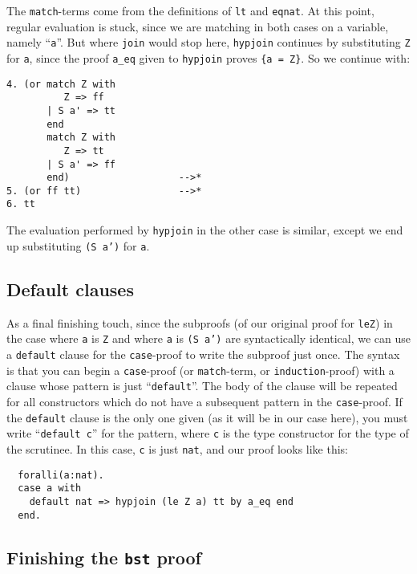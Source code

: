 \documentclass{book}[12pt]
\begin{document}
\noindent The \texttt{match}-terms come from the definitions of
\texttt{lt} and \texttt{eqnat}.  At this point, regular evaluation is
stuck, since we are matching in both cases on a variable, namely
``\texttt{a}''.  But where \texttt{join} would stop here,
\texttt{hypjoin} continues by substituting \texttt{Z} for \texttt{a},
since the proof \texttt{a\_eq} given to \texttt{hypjoin} proves
\texttt{\{a = Z\}}.  So we continue with:
                
\begin{verbatim}
4. (or match Z with
          Z => ff
       | S a' => tt
       end
       match Z with
          Z => tt
       | S a' => ff
       end)                   -->*
5. (or ff tt)                 -->*
6. tt
\end{verbatim}

\noindent The evaluation performed by \texttt{hypjoin} in the other
case is similar, except we end up substituting \texttt{(S a')} for
\texttt{a}.

\subsection{Default clauses}

As a final finishing touch, since the subproofs (of our original proof
for \texttt{leZ}) in the case where \texttt{a} is \texttt{Z} and where
\texttt{a} is \texttt{(S a')} are syntactically identical, we can use
a \texttt{default} clause for the \texttt{case}-proof to write the
subproof just once.  The syntax is that you can begin a
\texttt{case}-proof (or \texttt{match}-term, or
\texttt{induction}-proof) with a clause whose pattern is just
``\texttt{default}''.  The body of the clause will be repeated for all
constructors which do not have a subsequent pattern in the
\texttt{case}-proof.  If the \texttt{default} clause is the only one
given (as it will be in our case here), you must write
``\texttt{default c}'' for the pattern, where \texttt{c} is the type
constructor for the type of the scrutinee.  In this case, \texttt{c} is
just \texttt{nat}, and our proof looks like this:

\begin{verbatim}
  foralli(a:nat).
  case a with
    default nat => hypjoin (le Z a) tt by a_eq end
  end.
\end{verbatim}

\subsection{Finishing the \texttt{bst} proof}
\end{document}
